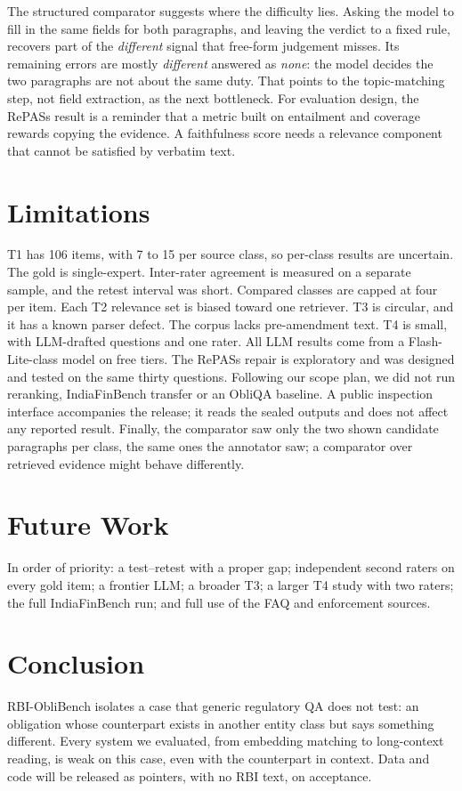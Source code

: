 \documentclass[conference]{IEEEtran}
\begin{document}
The structured comparator suggests where the difficulty lies. Asking the model to fill in the same fields for both paragraphs, and
leaving the verdict to a fixed rule, recovers part of the \textit{different} signal that free-form judgement misses. Its remaining
errors are mostly \textit{different} answered as \textit{none}: the model decides the two paragraphs are not about the same duty.
That points to the topic-matching step, not field extraction, as the next bottleneck. For evaluation design, the RePASs result is a
reminder that a metric built on entailment and coverage rewards copying the evidence. A faithfulness score needs a relevance
component that cannot be satisfied by verbatim text.

\section{Limitations}\label{sec:limitations}
T1 has 106 items, with 7 to 15 per source class, so per-class results are uncertain. The
gold is single-expert. Inter-rater agreement is measured on a separate sample, and the retest interval was short. Compared classes
are capped at four per item. Each T2 relevance set is biased toward one retriever. T3 is circular, and it has a known parser defect.
The corpus lacks pre-amendment text. T4 is small, with LLM-drafted questions and one rater. All LLM results come from a
Flash-Lite-class model on free tiers. The RePASs repair is exploratory and was designed and tested on the same thirty questions. Following our scope plan, we did not run
reranking, IndiaFinBench transfer or an ObliQA baseline. A public inspection interface accompanies the release; it reads the sealed outputs and does not affect any reported result. Finally, the comparator saw only the two shown
candidate paragraphs per class, the same ones the annotator saw; a comparator over retrieved evidence might behave differently.

\section{Future Work}\label{sec:future}
In order of priority: a test--retest with a proper gap; independent second raters on every gold item; a frontier LLM;
a broader T3; a larger T4 study with two raters; the full IndiaFinBench run; and full use of the FAQ and enforcement sources.

\section{Conclusion}\label{sec:conclusion}
RBI-ObliBench isolates a case that generic regulatory QA does not test: an obligation whose counterpart exists in another entity
class but says something different. Every system we evaluated, from embedding matching to long-context reading, is weak on this
case, even with the counterpart in context. Data and code will be released as pointers, with no RBI text, on acceptance.
\end{document}

